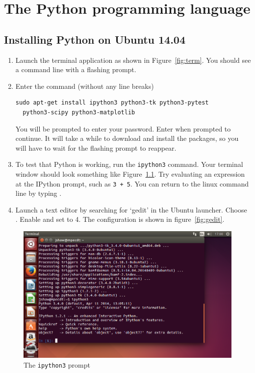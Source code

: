 \documentclass[a4paper,twoside,titlepage]{memoir}
\newcommand{\shellcmd}{\texttt}
\begin{document}
\chapter{The Python programming language}

\section{Installing Python on Ubuntu 14.04}
\label{sec:installation}

\begin{enumerate}
\item Launch the terminal application as shown in Figure~\ref{fig:term}.  You should see a command line with a flashing prompt.
\item Enter the command (without any line breaks)
\begin{verbatim}
sudo apt-get install ipython3 python3-tk python3-pytest
  python3-scipy python3-matplotlib
\end{verbatim}
You will be prompted to enter your password.  Enter  when prompted to continue.  It will take a while to download and install the packages, so you will have to wait for the flashing prompt to reappear.
\item To test that Python is working, run the \shellcmd{ipython3} command.  Your terminal window should look something like Figure~\ref{fig:ipython3}.  Try evaluating an expression at the IPython prompt, such as \shellcmd{3 + 5}.  You can return to the linux command line by typing .
\item Launch a text editor by searching for `gedit' in the Ubuntu launcher.  Choose .  Enable  and set  to 4.  The configuration is shown in figure~\ref{fig:gedit}.
\end{enumerate}

\begin{figure}
	\includegraphics[width=\textwidth]{ipython3.png}
	\caption{The \shellcmd{ipython3} prompt}
	\label{fig:ipython3}
\end{figure}
\end{document}
